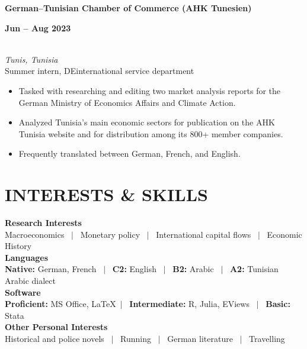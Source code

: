 \documentclass[a4paper,9pt]{extarticle}
\begin{document}
\noindent
\begin{minipage}[t]{0.7\textwidth}
  \textbf{German--Tunisian Chamber of Commerce (AHK Tunesien)}
\end{minipage}
\begin{minipage}[t]{0.3\textwidth}
  \raggedleft \textbf{Jun -- Aug 2023}
\end{minipage}
\\
\textit{Tunis, Tunisia} \\ 
Summer intern, DEinternational service department 
\begin{itemize}[noitemsep, topsep=0pt, left=0.65cm]
    \item Tasked with researching and editing two market analysis reports for the German Ministry of Economics Affairs and Climate Action.
    \item Analyzed Tunisia's main economic sectors for publication on the AHK Tunisia website and for distribution among its 800+ member companies. 
    \item Frequently translated between German, French, and English. \\
\end{itemize} 


\section*{INTERESTS \& SKILLS}

\noindent
\newline
\textbf{Research Interests} \\
Macroeconomics \ $|$ \ Monetary policy \ $|$ \ International capital flows \ $|$ \ Economic History \\

\noindent
\textbf{Languages} \\
\textbf{Native:} German, French \ $|$ \ \textbf{C2:} English \ $|$ \ \textbf{B2:} Arabic \ $|$ \ \textbf{A2:} Tunisian Arabic dialect \\

\noindent
\textbf{Software} \\
\textbf{Proficient:} MS Office, \LaTeX \ $|$ \ \textbf{Intermediate:} R, Julia, EViews \ $|$ \ \textbf{Basic:} Stata  \\

\noindent
\textbf{Other Personal Interests} \\
Historical and police novels \ $|$ \ Running \ $|$ \ German literature \ $|$ \ Travelling  \\
\end{document}

